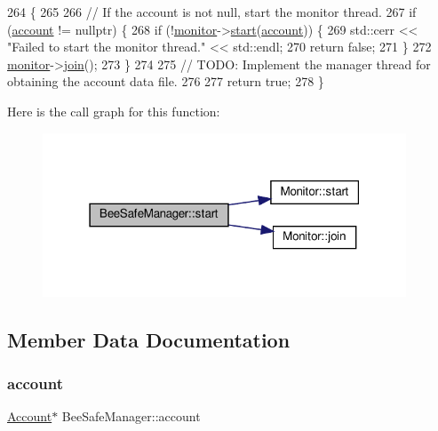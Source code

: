 \begin{DoxyCode}
264 \{
265 
266     \textcolor{comment}{// If the account is not null, start the monitor thread.}
267     \textcolor{keywordflow}{if} (\hyperlink{class_bee_safe_manager_a52bc9bc8c1ea9608b83d603b142443b0}{account} != \textcolor{keyword}{nullptr}) \{
268         \textcolor{keywordflow}{if} (!\hyperlink{class_bee_safe_manager_a3b885b4fb364228c914095f2e670f9af}{monitor}->\hyperlink{class_monitor_a71dfa92dfa25ee137f4e3d5e01a8d673}{start}(\hyperlink{class_bee_safe_manager_a52bc9bc8c1ea9608b83d603b142443b0}{account})) \{
269             std::cerr << \textcolor{stringliteral}{"Failed to start the monitor thread."} << std::endl;
270             \textcolor{keywordflow}{return} \textcolor{keyword}{false};
271         \}
272         \hyperlink{class_bee_safe_manager_a3b885b4fb364228c914095f2e670f9af}{monitor}->\hyperlink{class_monitor_a2d2e309666c98333a317c9786f94f6ad}{join}();
273     \}
274 
275     \textcolor{comment}{// TODO: Implement the manager thread for obtaining the account data file.}
276 
277     \textcolor{keywordflow}{return} \textcolor{keyword}{true};
278 \}
\end{DoxyCode}
Here is the call graph for this function\+:
\nopagebreak
\begin{figure}[H]
\begin{center}
\leavevmode
\includegraphics[width=307pt]{d5/d75/class_bee_safe_manager_a7242d89761621de0e09ec9ea360fca27_cgraph}
\end{center}
\end{figure}


\subsection{Member Data Documentation}
\mbox{\label{class_bee_safe_manager_a52bc9bc8c1ea9608b83d603b142443b0}} 
\subsubsection{\texorpdfstring{account}{account}}
{\footnotesize\ttfamily \hyperlink{class_account}{Account}$\ast$ Bee\+Safe\+Manager\+::account\hspace{0.3cm}{\ttfamily [private]}}



